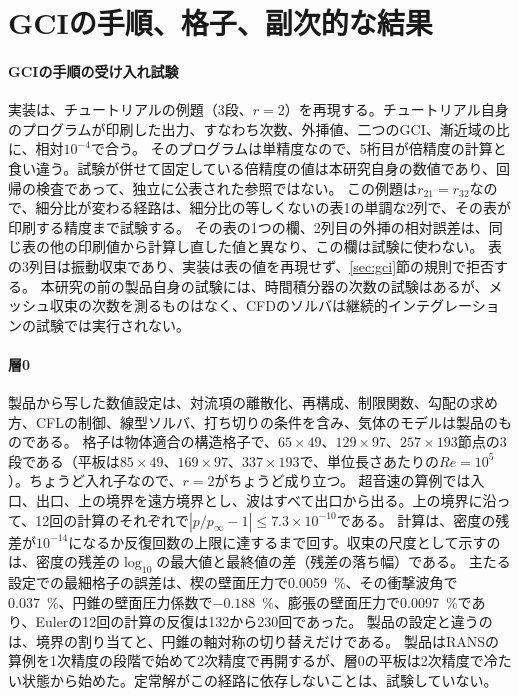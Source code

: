 \documentclass[twocolumn]{labreport}
\newcommand{\pinf}{p_\infty}
\begin{document}



\appendix

\section{GCIの手順、格子、副次的な結果}
\label{sec:appA}

\paragraph{GCIの手順の受け入れ試験}
実装は、チュートリアルの例題\citep{nparc_spatial}（3段、$r=2$）を再現する。チュートリアル自身のプログラムが印刷した出力、すなわち次数、外挿値、二つのGCI、漸近域の比に、相対$10^{-4}$で合う。
そのプログラムは単精度なので、5桁目が倍精度の計算と食い違う。試験が併せて固定している倍精度の値は本研究自身の数値であり、回帰の検査であって、独立に公表された参照ではない。
この例題は$r_{21}=r_{32}$なので、細分比が変わる経路は、細分比の等しくない\citet{celik2008}の表1の単調な2列で、その表が印刷する精度まで試験する。
その表の1つの欄、2列目の外挿の相対誤差は、同じ表の他の印刷値から計算し直した値と異なり、この欄は試験に使わない。
表の3列目は振動収束であり、実装は表の値を再現せず、\ref{sec:gci}節の規則で拒否する。
本研究の前の製品自身の試験には、時間積分器の次数の試験はあるが、メッシュ収束の次数を測るものはなく、CFDのソルバは継続的インテグレーションの試験では実行されない。

\paragraph{層0}
製品から写した数値設定は、対流項の離散化、再構成、制限関数、勾配の求め方、CFLの制御、線型ソルバ、打ち切りの条件を含み、気体のモデルは製品のものである。
格子は物体適合の構造格子で、$65\times49$、$129\times97$、$257\times193$節点の3段である（平板は$85\times49$、$169\times97$、$337\times193$で、単位長さあたりの$Re=10^5$）。ちょうど入れ子なので、$r=2$がちょうど成り立つ。
超音速の算例では入口、出口、上の境界を遠方境界とし、波はすべて出口から出る。上の境界に沿って、12回の計算のそれぞれで$|p/\pinf-1|\le7.3\times10^{-10}$である。
計算は、密度の残差が$10^{-14}$になるか反復回数の上限に達するまで回す。収束の尺度として示すのは、密度の残差の$\log_{10}$の最大値と最終値の差（残差の落ち幅）である。
主たる設定での最細格子の誤差は、楔の壁面圧力で0.0059~\%、その衝撃波角で0.037~\%、円錐の壁面圧力係数で$-0.188$~\%、膨張の壁面圧力で0.0097~\%であり、Eulerの12回の計算の反復は132から230回であった。
製品の設定と違うのは、境界の割り当てと、円錐の軸対称の切り替えだけである。
製品はRANSの算例を1次精度の段階で始めて2次精度で再開するが、層0の平板は2次精度で冷たい状態から始めた。定常解がこの経路に依存しないことは、試験していない。
\end{document}
